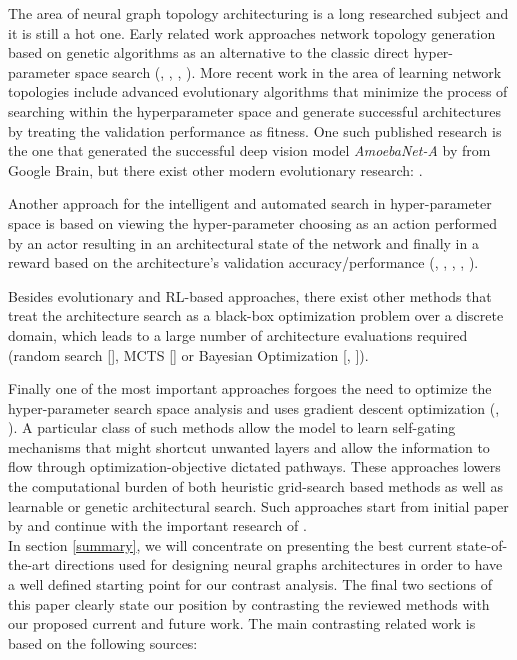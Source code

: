 \documentclass[11pt,a4paper]{article}
\begin{document}
The area of neural graph topology architecturing is a long researched subject and it is still a hot one. Early related work approaches network topology generation based on genetic algorithms as an alternative to the classic direct hyper-parameter space search (\citet{MillerG.F.;ToddP.M.;Hegde1989}, \citet{Stanley2002}, \citet{Wierstra2005}, \citet{Floreano2008}). More recent work in the area of learning network topologies include advanced evolutionary algorithms that minimize the process of searching within the hyperparameter space and generate successful architectures by treating the validation performance as fitness. One such published research is the one that generated the successful deep vision model \textit{AmoebaNet-A} by \citet{Real2018} from Google Brain, but there exist other modern evolutionary research: \citet{Suganuma2018}.

Another approach for the intelligent and automated search in hyper-parameter space is based on viewing the hyper-parameter choosing as an action performed by an actor resulting in an architectural state of the network and finally in a reward based on the architecture's validation accuracy/performance (\citet{Baker2017}, \citet{Zoph2017}, \citet{Zoph2018}, \citet{Pham2018}, \citet{Zhong2018}). 

Besides evolutionary and RL-based approaches, there exist other methods that treat the architecture search as a black-box optimization problem over a discrete domain, which leads to a large number of architecture evaluations required (random search [\citet{Bergstra2012}], MCTS [\citet{Negrinho2017}] or Bayesian Optimization [\citet{Snoek2012}, \citet{Kandasamy2018}]).

Finally one of the most important approaches forgoes the need to optimize the hyper-parameter search space analysis and uses gradient descent optimization (\citet{brock2017smash}, \citet{Liu2018}). A particular class of such methods allow the model to learn self-gating mechanisms that might shortcut unwanted layers and allow the information to flow through optimization-objective dictated pathways. These approaches lowers the computational burden of both heuristic grid-search based methods as well as learnable or genetic architectural search. Such approaches start from initial paper by \citet{srivastava2015highway} and continue with the important research of \citet{hu2019squeezeandexcitation}.\\

In section \ref{summary}, we will concentrate on presenting the best current state-of-the-art directions used for designing neural graphs architectures in order to have a well defined starting point for our contrast analysis. The final two sections of this paper clearly state our position by contrasting the reviewed methods with our proposed current and future work. The main contrasting related work is based on the following sources:
\end{document}
